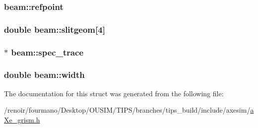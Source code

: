 \hypertarget{structbeam_a54c64670a8b3e8732c1468d156ddb0ca}{
\subsubsection[{refpoint}]{ {\bf beam::refpoint}}}
\label{structbeam_a54c64670a8b3e8732c1468d156ddb0ca}
\hypertarget{structbeam_acc5dfdc4ba4457869ecb2a9395d1273e}{
\subsubsection[{slitgeom}]{\setlength{\rightskip}{0pt plus 5cm}double {\bf beam::slitgeom}\mbox{[}4\mbox{]}}}
\label{structbeam_acc5dfdc4ba4457869ecb2a9395d1273e}
\hypertarget{structbeam_a918b8655ff4142f173ca73226ce27922}{
\subsubsection[{spec\_\-trace}]{$\ast$ {\bf beam::spec\_\-trace}}}
\label{structbeam_a918b8655ff4142f173ca73226ce27922}
\hypertarget{structbeam_ae99ff960c070381b6e76af5a58cb9c45}{
\subsubsection[{width}]{\setlength{\rightskip}{0pt plus 5cm}double {\bf beam::width}}}
\label{structbeam_ae99ff960c070381b6e76af5a58cb9c45}


The documentation for this struct was generated from the following file:\begin{DoxyCompactItemize}
\item 
/renoir/fourmano/Desktop/OUSIM/TIPS/branches/tips\_\-build/include/axesim/\hyperlink{aXe__grism_8h}{aXe\_\-grism.h}\end{DoxyCompactItemize}
